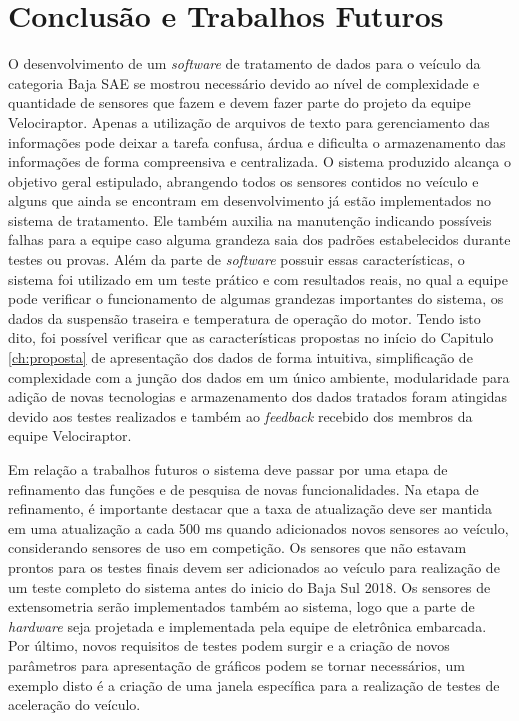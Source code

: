\chapter{Conclusão e Trabalhos Futuros}
	\label{ch:consideracoes}
O desenvolvimento de um \textit{software} de tratamento de dados para o veículo da categoria Baja SAE se mostrou necessário devido ao nível de complexidade e quantidade de sensores que fazem e devem fazer parte do projeto da equipe Velociraptor. Apenas a utilização de arquivos de texto para gerenciamento das informações pode deixar a tarefa confusa, árdua e dificulta o armazenamento das informações de forma compreensiva e centralizada. O sistema produzido alcança o objetivo geral estipulado, abrangendo todos os sensores contidos no veículo e alguns que ainda se encontram em desenvolvimento já estão implementados no sistema de tratamento. Ele também auxilia na manutenção indicando possíveis falhas para a equipe caso alguma grandeza saia dos padrões estabelecidos durante testes ou provas. Além da parte de \textit{software} possuir essas características, o sistema foi utilizado em um teste prático e com resultados reais, no qual a equipe pode verificar o funcionamento de algumas grandezas importantes do sistema, os dados da suspensão traseira e temperatura de operação do motor. Tendo isto dito, foi possível verificar que as características propostas no início do Capitulo \ref{ch:proposta} de apresentação dos dados de forma intuitiva, simplificação de complexidade com a junção dos dados em um único ambiente, modularidade para adição de novas tecnologias e armazenamento dos dados tratados foram atingidas devido aos testes realizados e também ao \textit{feedback} recebido dos membros da equipe Velociraptor.


Em relação a trabalhos futuros o sistema deve passar por uma etapa de refinamento das funções e de pesquisa de novas funcionalidades. Na etapa de refinamento, é importante destacar que a taxa de atualização deve ser mantida em uma atualização a cada 500 ms quando adicionados novos sensores ao veículo, considerando sensores de uso em competição. Os sensores que não estavam prontos para os testes finais devem ser adicionados ao veículo para realização de um teste completo do sistema antes do inicio do Baja Sul 2018. Os sensores de extensometria serão implementados também ao sistema, logo que a parte de \textit{hardware} seja projetada e implementada pela equipe de eletrônica embarcada. Por último, novos requisitos de testes podem surgir e a criação de novos parâmetros para apresentação de gráficos podem se tornar necessários, um exemplo disto é a criação de uma janela específica para a realização de testes de aceleração do veículo.

